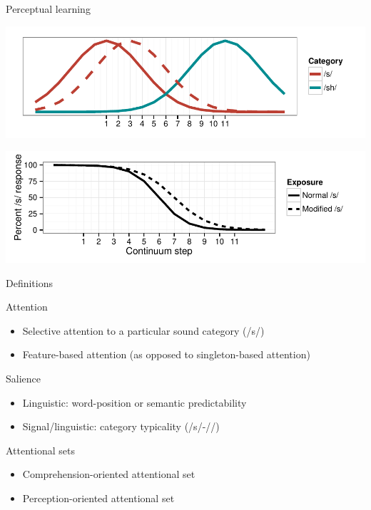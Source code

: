 \documentclass{beamer}
\begin{document}
\begin{frame}{Perceptual learning}

\includegraphics[width=1.1\textwidth]{graphs/dist.pdf}

\includegraphics[width=1.1\textwidth]{graphs/class.pdf}

\end{frame}

\begin{frame}{Definitions}

    Attention
\begin{itemize}
\item Selective attention to a particular sound category (/s/)
\item Feature-based attention (as opposed to singleton-based attention)
\end{itemize}
 Salience
\begin{itemize}
\item Linguistic: word-position or semantic predictability
\item Signal/linguistic: category typicality (/s/-/\textesh/)
\end{itemize}
Attentional sets
\begin{itemize}
\item Comprehension-oriented attentional set
\item Perception-oriented attentional set
\end{itemize}
\end{frame}
\end{document}
